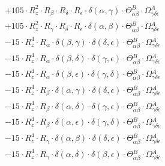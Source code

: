 \documentclass{article}
\begin{document}
\begin{equation}
\begin{array}{c}
 \\[0.2em] 		 + 105 \cdot R_{z}^{2} \cdot R_{\beta{}} \cdot R_{\delta{}} \cdot R_{\epsilon{}} \cdot \delta{}\left(\alpha{}, \gamma{}\right) \cdot \Theta{}^{B}_{\alpha{}\beta{}} \cdot \Omega{}^{A}_{\gamma{}\delta{}\epsilon{}} 
 \\[0.2em] 		 + 105 \cdot R_{z}^{2} \cdot R_{\gamma{}} \cdot R_{\delta{}} \cdot R_{\epsilon{}} \cdot \delta{}\left(\alpha{}, \beta{}\right) \cdot \Theta{}^{B}_{\alpha{}\beta{}} \cdot \Omega{}^{A}_{\gamma{}\delta{}\epsilon{}} 
 \\[0.2em] 		 - 15 \cdot R_{z}^{4} \cdot R_{\alpha{}} \cdot \delta{}\left(\beta{}, \gamma{}\right) \cdot \delta{}\left(\delta{}, \epsilon{}\right) \cdot \Theta{}^{B}_{\alpha{}\beta{}} \cdot \Omega{}^{A}_{\gamma{}\delta{}\epsilon{}} 
 \\[0.2em] 		 - 15 \cdot R_{z}^{4} \cdot R_{\alpha{}} \cdot \delta{}\left(\beta{}, \delta{}\right) \cdot \delta{}\left(\gamma{}, \epsilon{}\right) \cdot \Theta{}^{B}_{\alpha{}\beta{}} \cdot \Omega{}^{A}_{\gamma{}\delta{}\epsilon{}} 
 \\[0.2em] 		 - 15 \cdot R_{z}^{4} \cdot R_{\alpha{}} \cdot \delta{}\left(\beta{}, \epsilon{}\right) \cdot \delta{}\left(\gamma{}, \delta{}\right) \cdot \Theta{}^{B}_{\alpha{}\beta{}} \cdot \Omega{}^{A}_{\gamma{}\delta{}\epsilon{}} 
 \\[0.2em] 		 - 15 \cdot R_{z}^{4} \cdot R_{\beta{}} \cdot \delta{}\left(\alpha{}, \gamma{}\right) \cdot \delta{}\left(\delta{}, \epsilon{}\right) \cdot \Theta{}^{B}_{\alpha{}\beta{}} \cdot \Omega{}^{A}_{\gamma{}\delta{}\epsilon{}} 
 \\[0.2em] 		 - 15 \cdot R_{z}^{4} \cdot R_{\beta{}} \cdot \delta{}\left(\alpha{}, \delta{}\right) \cdot \delta{}\left(\gamma{}, \epsilon{}\right) \cdot \Theta{}^{B}_{\alpha{}\beta{}} \cdot \Omega{}^{A}_{\gamma{}\delta{}\epsilon{}} 
 \\[0.2em] 		 - 15 \cdot R_{z}^{4} \cdot R_{\beta{}} \cdot \delta{}\left(\alpha{}, \epsilon{}\right) \cdot \delta{}\left(\gamma{}, \delta{}\right) \cdot \Theta{}^{B}_{\alpha{}\beta{}} \cdot \Omega{}^{A}_{\gamma{}\delta{}\epsilon{}} 
 \\[0.2em] 		 - 15 \cdot R_{z}^{4} \cdot R_{\gamma{}} \cdot \delta{}\left(\alpha{}, \beta{}\right) \cdot \delta{}\left(\delta{}, \epsilon{}\right) \cdot \Theta{}^{B}_{\alpha{}\beta{}} \cdot \Omega{}^{A}_{\gamma{}\delta{}\epsilon{}} 
 \\[0.2em] 		 - 15 \cdot R_{z}^{4} \cdot R_{\gamma{}} \cdot \delta{}\left(\alpha{}, \delta{}\right) \cdot \delta{}\left(\beta{}, \epsilon{}\right) \cdot \Theta{}^{B}_{\alpha{}\beta{}} \cdot \Omega{}^{A}_{\gamma{}\delta{}\epsilon{}} 

\end{array}
\end{equation}
\end{document}

